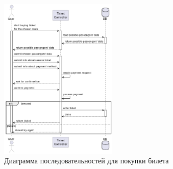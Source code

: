 \newpage
\begin{figure}[H]
    \centering
    \includegraphics[width=0.5\textwidth]{model/buy.png}
    \caption{Диаграмма последовательностей для покупки билета}
\end{figure}
